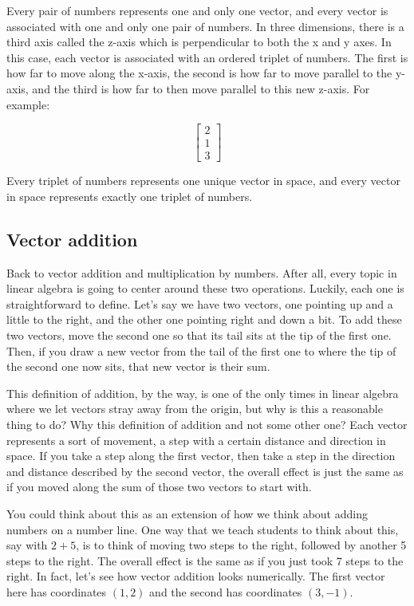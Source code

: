 Every pair of numbers represents one and only one vector, and every vector is
associated with one and only one pair of numbers. In three dimensions, there is
a third axis called the z-axis which is perpendicular to both the x and y axes.
In this case, each vector is associated with an ordered triplet of numbers. The
first is how far to move along the x-axis, the second is how far to move
parallel to the y-axis, and the third is how far to then move parallel to this
new z-axis. For example:

\begin{equation*}
  \begin{bmatrix}
    2 \\
    1 \\
    3
  \end{bmatrix}
\end{equation*}

Every triplet of numbers represents one unique vector in space, and every vector
in space represents exactly one triplet of numbers.

\subsection{Vector addition}

Back to vector addition and multiplication by numbers. After all, every topic in
linear algebra is going to center around these two operations. Luckily, each
one is straightforward to define. Let's say we have two vectors, one pointing up
and a little to the right, and the other one pointing right and down a bit. To
add these two vectors, move the second one so that its tail sits at the tip of
the first one. Then, if you draw a new vector from the tail of the first one to
where the tip of the second one now sits, that new vector is their sum.

This definition of addition, by the way, is one of the only times in linear
algebra where we let vectors stray away from the origin, but why is this a
reasonable thing to do? Why this definition of addition and not some other one?
Each vector represents a sort of movement, a step with a certain distance and
direction in space. If you take a step along the first vector, then take a step
in the direction and distance described by the second vector, the overall effect
is just the same as if you moved along the sum of those two vectors to start
with.

You could think about this as an extension of how we think about adding numbers
on a number line. One way that we teach students to think about this, say with
$2 + 5$, is to think of moving two steps to the right, followed by another 5
steps to the right. The overall effect is the same as if you just took 7 steps
to the right. In fact, let's see how vector addition looks numerically. The
first vector here has coordinates $(1, 2)$ and the second has coordinates
$(3, -1)$.

